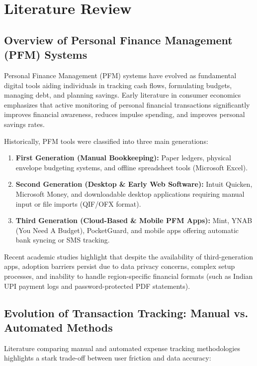 \documentclass[../Project-Report-Main.tex]{subfiles}
\begin{document}
\chapter{Literature Review}

\section{Overview of Personal Finance Management (PFM) Systems}

Personal Finance Management (PFM) systems have evolved as fundamental digital tools aiding individuals in tracking cash flows, formulating budgets, managing debt, and planning savings. Early literature in consumer economics emphasizes that active monitoring of personal financial transactions significantly improves financial awareness, reduces impulse spending, and improves personal savings rates.

Historically, PFM tools were classified into three main generations:
\begin{enumerate}
 \item \textbf{First Generation (Manual Bookkeeping):} Paper ledgers, physical envelope budgeting systems, and offline spreadsheet tools (Microsoft Excel).
 \item \textbf{Second Generation (Desktop \& Early Web Software):} Intuit Quicken, Microsoft Money, and downloadable desktop applications requiring manual input or file imports (QIF/OFX format).
 \item \textbf{Third Generation (Cloud-Based \& Mobile PFM Apps):} Mint, YNAB (You Need A Budget), PocketGuard, and mobile apps offering automatic bank syncing or SMS tracking.
\end{enumerate}

Recent academic studies highlight that despite the availability of third-generation apps, adoption barriers persist due to data privacy concerns, complex setup processes, and inability to handle region-specific financial formats (such as Indian UPI payment logs and password-protected PDF statements).

\section{Evolution of Transaction Tracking: Manual vs. Automated Methods}

Literature comparing manual and automated expense tracking methodologies highlights a stark trade-off between user friction and data accuracy:
\end{document}
